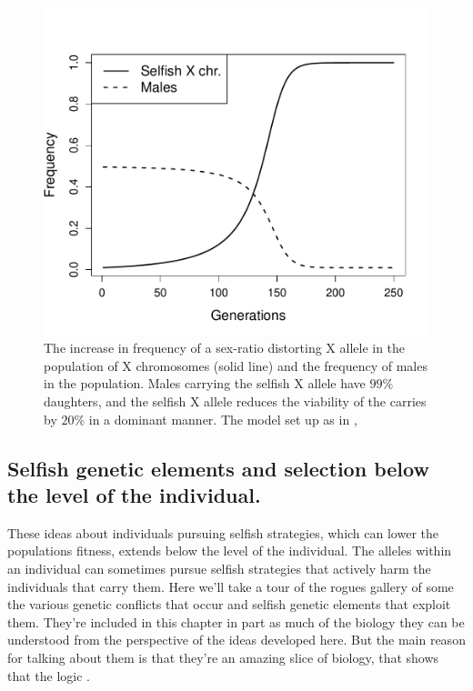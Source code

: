 {\begin{figure}
\begin{center}
\includegraphics[width= \textwidth]{figures/sex_ratio_distortor.pdf}

\end{center}
\caption{The increase in frequency of a sex-ratio distorting X allele in the population of
  X chromosomes (solid line) and the frequency of males in the
  population. Males carrying the selfish X allele have $99\%$
  daughters, and the selfish X allele reduces the viability of the
  carries by $20\%$ in a dominant manner. The model set up as in \citet{edwards1961population}, } \label{fig:selfish_X_freqs}
\end{figure}

\subsection{Selfish genetic elements and selection below the level of
  the individual.}

These ideas about individuals pursuing selfish strategies, which can
lower the populations fitness, extends below the level of the individual. The alleles within an
individual can sometimes pursue selfish strategies that
actively harm the individuals that carry them. Here we'll take a tour
of the rogues gallery of some the various
genetic conflicts that occur and selfish genetic elements that exploit
them. They're included in this chapter in part as much of the biology they can
be understood from the perspective of the ideas developed here. But the main reason for talking about them is that they're an
amazing slice of biology, that shows that the logic . %


}
